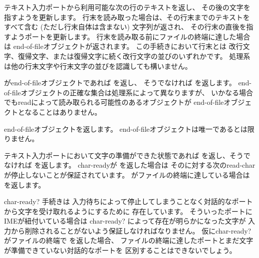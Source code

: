 \begin{entry}{%
}

テキスト入力ポートから利用可能な次の行のテキストを返し、
その後の文字を指すようを更新します。
行末を読み取った場合は、その行末までのテキストをすべて含む
(ただし行末自体は含まない) 文字列が返され、
その行末の直後を指すようポートを更新します。
行末を読み取る前にファイルの終端に達した場合は
end-of-fileオブジェクトが返されます。
この手続きにおいて行末とは
改行文字、復帰文字、または復帰文字に続く改行文字の並びのいずれかです。
処理系は他の行末文字や行末文字の並びを認識しても構いません。

\end{entry}


\begin{entry}{%
}

がend-of-fileオブジェクトであれば \schtrue{}を返し、
そうでなければ \schfalse{}を返します。
end-of-fileオブジェクトの正確な集合は処理系によって異なりますが、
いかなる場合でも{\cf read}によって読み取られる可能性のあるオブジェクトが
end-of-fileオブジェクトとなることはありません。

\end{entry}

\begin{entry}{%
}

end-of-fileオブジェクトを返します。
end-of-fileオブジェクトは唯一であるとは限りません。

\end{entry}


\begin{entry}{%
}

テキスト入力ポートにおいて文字の準備ができた状態であれば %
\schtrue{}を返し、そうでなければ \schfalse{}を返します。
{\cf char-ready}が \schtrue{}を返した場合は
そのに対する次の{\cf read-char}が停止しないことが保証されています。
がファイルの終端に達している場合は \schtrue{}を返します。

\begin{rationale}
{\cf char-ready?} 手続きは
入力待ちによって停止してしまうことなく対話的なポートから文字を受け取れるようにするために
存在しています。
そういったポートにIMEが紐付いている場合は
{\cf char-ready?} によって存在が明らかになった文字が
入力から削除されることがないよう保証しなければなりません。
仮に{\cf char-ready?} がファイルの終端で \schfalse{}を返した場合、
ファイルの終端に達したポートとまだ文字が準備できていない対話的なポートを
区別することはできないでしょう。
\end{rationale}
\end{entry}

